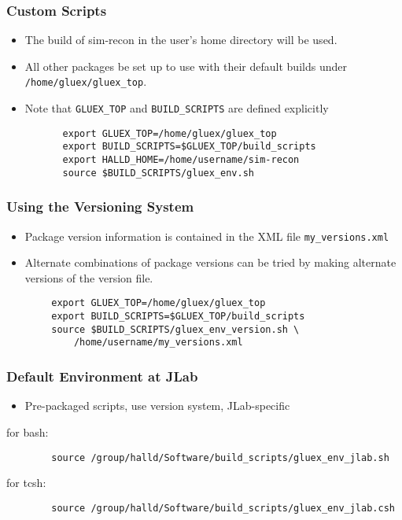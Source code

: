 \documentclass{beamer}
\newcommand{\bi}{\begin{itemize}}
\newcommand{\ei}{\end{itemize}}
\newcommand{\I}{\item}
\begin{document}
\begin{frame}[fragile]
  \frametitle{Custom Scripts}\label{section:custom-scripts}
\bi
\I The build of sim-recon in the user's home directory will be used.
\I All other packages be set up to use with their default builds under {\tt
    /home/gluex/gluex\_top}.
\I Note that {\tt GLUEX\_TOP} and {\tt BUILD\_SCRIPTS} are defined explicitly
\ei
\begin{verbatim}
          export GLUEX_TOP=/home/gluex/gluex_top
          export BUILD_SCRIPTS=$GLUEX_TOP/build_scripts
          export HALLD_HOME=/home/username/sim-recon
          source $BUILD_SCRIPTS/gluex_env.sh
\end{verbatim}

\end{frame}
\begin{frame}[fragile]
  \frametitle{Using the Versioning System}
\bi
\I Package version information is contained in the XML file {\tt my\_versions.xml}
\I Alternate combinations of package versions can be tried by making alternate versions of the version file.
\ei
\begin{verbatim}
        export GLUEX_TOP=/home/gluex/gluex_top
        export BUILD_SCRIPTS=$GLUEX_TOP/build_scripts
        source $BUILD_SCRIPTS/gluex_env_version.sh \
            /home/username/my_versions.xml
\end{verbatim}

\end{frame}
\begin{frame}[fragile]
  \frametitle{Default Environment at JLab}
\bi
\I Pre-packaged scripts, use version system, JLab-specific
\ei
for bash:
\begin{verbatim}
        source /group/halld/Software/build_scripts/gluex_env_jlab.sh
\end{verbatim}
for tcsh:
\begin{verbatim}
        source /group/halld/Software/build_scripts/gluex_env_jlab.csh
\end{verbatim}

\end{frame}
\end{document}
